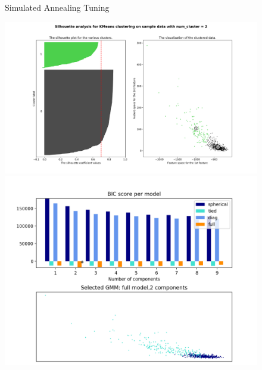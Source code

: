 \documentclass[a4paper,12pt]{article}
\begin{document}
\begin{figure}[!htb]
\begin{minipage}{0.33\textwidth}
   \end{minipage}\hfill
 \caption { Simulated Annealing Tuning}
\end{figure}

\begin{figure}[!htb]
   \begin{minipage}{0.33\textwidth}
     \centering
     \includegraphics[width=.95\linewidth]{kmeans_rp_dataset_sil_vis}
   \end{minipage}\hfill
    \begin{minipage}{0.33\textwidth}
     \centering
     \includegraphics[width=.95\linewidth]{em_rp_dataset1_visual}
     \end{minipage}\hfill
     \begin{minipage}{0.33\textwidth}
     \centering

\end{minipage}
\end{figure}
\end{document}
